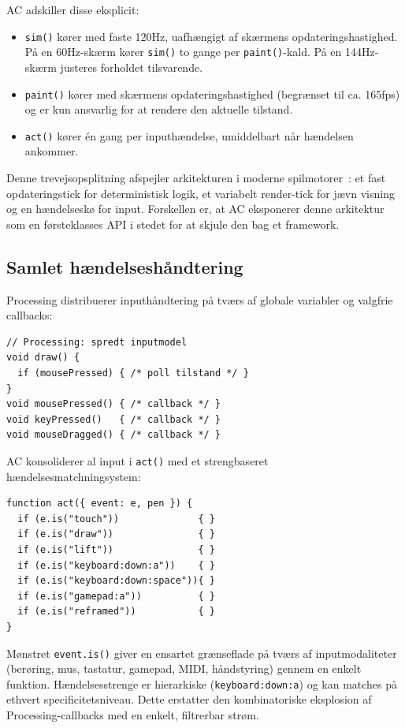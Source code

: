 \documentclass[10pt,letterpaper,twocolumn]{article}
\begin{document}
AC adskiller disse eksplicit:

\begin{itemize}
  \item \texttt{sim()} kører med faste 120Hz, uafhængigt af skærmens opdateringshastighed. På en 60Hz-skærm kører \texttt{sim()} to gange per \texttt{paint()}-kald. På en 144Hz-skærm justeres forholdet tilsvarende.
  \item \texttt{paint()} kører med skærmens opdateringshastighed (begrænset til ca. 165fps) og er kun ansvarlig for at rendere den aktuelle tilstand.
  \item \texttt{act()} kører én gang per inputhændelse, umiddelbart når hændelsen ankommer.
\end{itemize}

Denne trevejsopsplitning afspejler arkitekturen i moderne spilmotorer~\citep{nystrom2014game}: et fast opdateringstick for deterministisk logik, et variabelt render-tick for jævn visning og en hændelseskø for input. Forskellen er, at AC eksponerer denne arkitektur som en førsteklasses API i stedet for at skjule den bag et framework.

\subsection{Samlet hændelseshåndtering}

Processing distribuerer inputhåndtering på tværs af globale variabler og valgfrie callbacks:

\begin{lstlisting}[style=processingstyle]
// Processing: spredt inputmodel
void draw() {
  if (mousePressed) { /* poll tilstand */ }
}
void mousePressed() { /* callback */ }
void keyPressed()   { /* callback */ }
void mouseDragged() { /* callback */ }
\end{lstlisting}

AC konsoliderer al input i \texttt{act()} med et strengbaseret hændelsesmatchningsystem:

\begin{lstlisting}[style=acjsstyle]
function act({ event: e, pen }) {
  if (e.is("touch"))              { }
  if (e.is("draw"))               { }
  if (e.is("lift"))               { }
  if (e.is("keyboard:down:a"))    { }
  if (e.is("keyboard:down:space")){ }
  if (e.is("gamepad:a"))          { }
  if (e.is("reframed"))           { }
}
\end{lstlisting}

Mønstret \texttt{event.is()} giver en ensartet grænseflade på tværs af inputmodaliteter (berøring, mus, tastatur, gamepad, MIDI, håndstyring) gennem en enkelt funktion. Hændelsesstrenge er hierarkiske (\texttt{keyboard:down:a}) og kan matches på ethvert specificitetsniveau. Dette erstatter den kombinatoriske eksplosion af Processing-callbacks med en enkelt, filtrerbar strøm.
\end{document}
